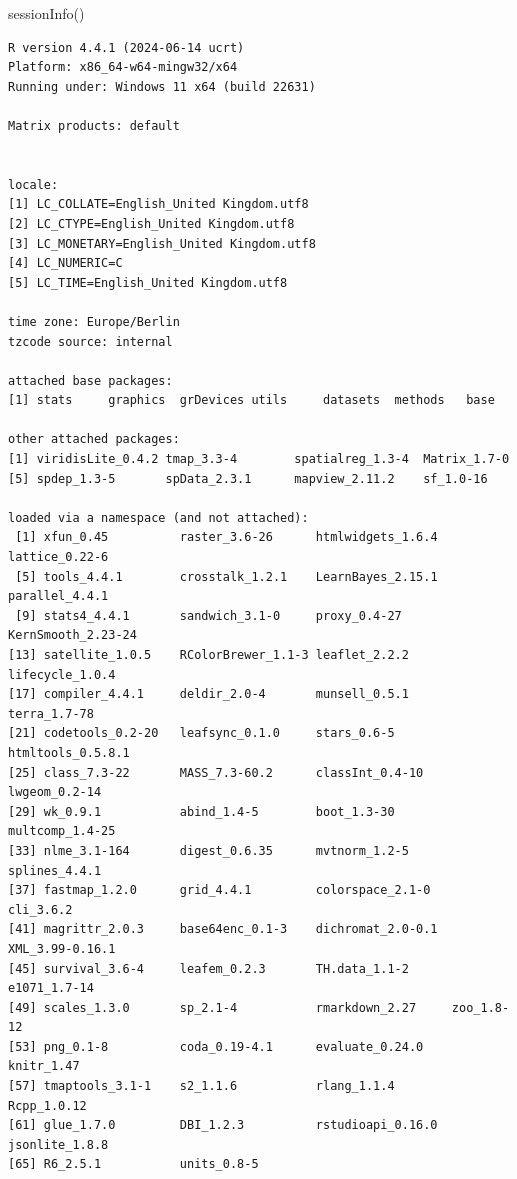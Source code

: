 \documentclass[
  letterpaper,
]{scrbook}
\newenvironment{Shaded}{\begin{snugshade}}{\end{snugshade}}
\newcommand{\FunctionTok}[1]{\textcolor[rgb]{0.28,0.35,0.67}{#1}}
\newcommand{\NormalTok}[1]{\textcolor[rgb]{0.00,0.23,0.31}{#1}}
\begin{document}
\begin{Shaded}
\begin{Highlighting}[]
\FunctionTok{sessionInfo}\NormalTok{()}
\end{Highlighting}
\end{Shaded}

\begin{verbatim}
R version 4.4.1 (2024-06-14 ucrt)
Platform: x86_64-w64-mingw32/x64
Running under: Windows 11 x64 (build 22631)

Matrix products: default


locale:
[1] LC_COLLATE=English_United Kingdom.utf8 
[2] LC_CTYPE=English_United Kingdom.utf8   
[3] LC_MONETARY=English_United Kingdom.utf8
[4] LC_NUMERIC=C                           
[5] LC_TIME=English_United Kingdom.utf8    

time zone: Europe/Berlin
tzcode source: internal

attached base packages:
[1] stats     graphics  grDevices utils     datasets  methods   base     

other attached packages:
[1] viridisLite_0.4.2 tmap_3.3-4        spatialreg_1.3-4  Matrix_1.7-0     
[5] spdep_1.3-5       spData_2.3.1      mapview_2.11.2    sf_1.0-16        

loaded via a namespace (and not attached):
 [1] xfun_0.45          raster_3.6-26      htmlwidgets_1.6.4  lattice_0.22-6    
 [5] tools_4.4.1        crosstalk_1.2.1    LearnBayes_2.15.1  parallel_4.4.1    
 [9] stats4_4.4.1       sandwich_3.1-0     proxy_0.4-27       KernSmooth_2.23-24
[13] satellite_1.0.5    RColorBrewer_1.1-3 leaflet_2.2.2      lifecycle_1.0.4   
[17] compiler_4.4.1     deldir_2.0-4       munsell_0.5.1      terra_1.7-78      
[21] codetools_0.2-20   leafsync_0.1.0     stars_0.6-5        htmltools_0.5.8.1 
[25] class_7.3-22       MASS_7.3-60.2      classInt_0.4-10    lwgeom_0.2-14     
[29] wk_0.9.1           abind_1.4-5        boot_1.3-30        multcomp_1.4-25   
[33] nlme_3.1-164       digest_0.6.35      mvtnorm_1.2-5      splines_4.4.1     
[37] fastmap_1.2.0      grid_4.4.1         colorspace_2.1-0   cli_3.6.2         
[41] magrittr_2.0.3     base64enc_0.1-3    dichromat_2.0-0.1  XML_3.99-0.16.1   
[45] survival_3.6-4     leafem_0.2.3       TH.data_1.1-2      e1071_1.7-14      
[49] scales_1.3.0       sp_2.1-4           rmarkdown_2.27     zoo_1.8-12        
[53] png_0.1-8          coda_0.19-4.1      evaluate_0.24.0    knitr_1.47        
[57] tmaptools_3.1-1    s2_1.1.6           rlang_1.1.4        Rcpp_1.0.12       
[61] glue_1.7.0         DBI_1.2.3          rstudioapi_0.16.0  jsonlite_1.8.8    
[65] R6_2.5.1           units_0.8-5       
\end{verbatim}
\end{document}
